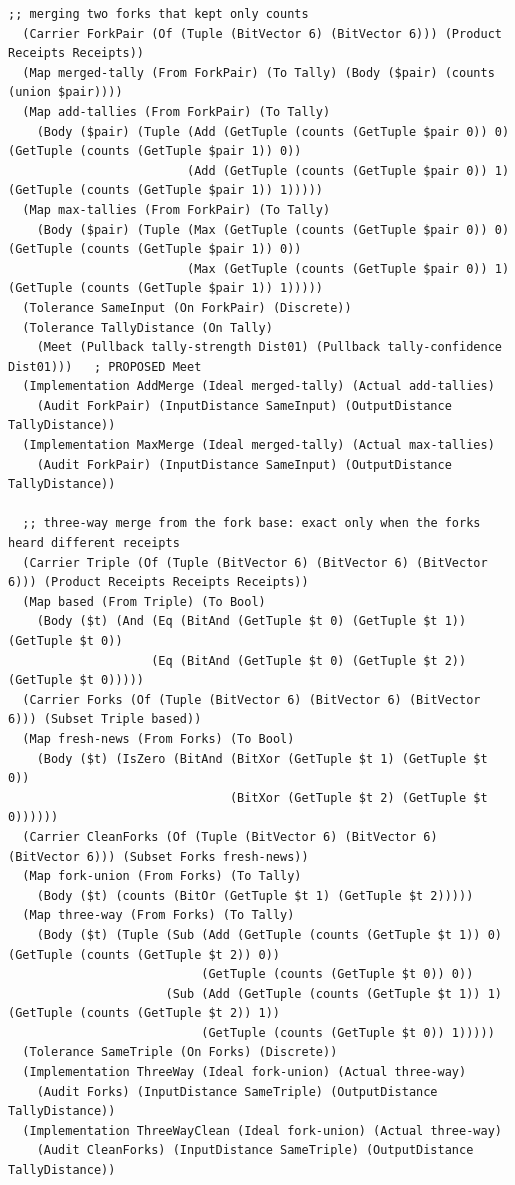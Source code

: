 \documentclass[11pt]{article}
\theoremstyle{definition}
\theoremstyle{plain}
\begin{document}
\begin{lstlisting}[style=mettafull]
  ;; merging two forks that kept only counts
  (Carrier ForkPair (Of (Tuple (BitVector 6) (BitVector 6))) (Product Receipts Receipts))
  (Map merged-tally (From ForkPair) (To Tally) (Body ($pair) (counts (union $pair))))
  (Map add-tallies (From ForkPair) (To Tally)
    (Body ($pair) (Tuple (Add (GetTuple (counts (GetTuple $pair 0)) 0) (GetTuple (counts (GetTuple $pair 1)) 0))
                         (Add (GetTuple (counts (GetTuple $pair 0)) 1) (GetTuple (counts (GetTuple $pair 1)) 1)))))
  (Map max-tallies (From ForkPair) (To Tally)
    (Body ($pair) (Tuple (Max (GetTuple (counts (GetTuple $pair 0)) 0) (GetTuple (counts (GetTuple $pair 1)) 0))
                         (Max (GetTuple (counts (GetTuple $pair 0)) 1) (GetTuple (counts (GetTuple $pair 1)) 1)))))
  (Tolerance SameInput (On ForkPair) (Discrete))
  (Tolerance TallyDistance (On Tally)
    (Meet (Pullback tally-strength Dist01) (Pullback tally-confidence Dist01)))   ; PROPOSED Meet
  (Implementation AddMerge (Ideal merged-tally) (Actual add-tallies)
    (Audit ForkPair) (InputDistance SameInput) (OutputDistance TallyDistance))
  (Implementation MaxMerge (Ideal merged-tally) (Actual max-tallies)
    (Audit ForkPair) (InputDistance SameInput) (OutputDistance TallyDistance))

  ;; three-way merge from the fork base: exact only when the forks heard different receipts
  (Carrier Triple (Of (Tuple (BitVector 6) (BitVector 6) (BitVector 6))) (Product Receipts Receipts Receipts))
  (Map based (From Triple) (To Bool)
    (Body ($t) (And (Eq (BitAnd (GetTuple $t 0) (GetTuple $t 1)) (GetTuple $t 0))
                    (Eq (BitAnd (GetTuple $t 0) (GetTuple $t 2)) (GetTuple $t 0)))))
  (Carrier Forks (Of (Tuple (BitVector 6) (BitVector 6) (BitVector 6))) (Subset Triple based))
  (Map fresh-news (From Forks) (To Bool)
    (Body ($t) (IsZero (BitAnd (BitXor (GetTuple $t 1) (GetTuple $t 0))
                               (BitXor (GetTuple $t 2) (GetTuple $t 0))))))
  (Carrier CleanForks (Of (Tuple (BitVector 6) (BitVector 6) (BitVector 6))) (Subset Forks fresh-news))
  (Map fork-union (From Forks) (To Tally)
    (Body ($t) (counts (BitOr (GetTuple $t 1) (GetTuple $t 2)))))
  (Map three-way (From Forks) (To Tally)
    (Body ($t) (Tuple (Sub (Add (GetTuple (counts (GetTuple $t 1)) 0) (GetTuple (counts (GetTuple $t 2)) 0))
                           (GetTuple (counts (GetTuple $t 0)) 0))
                      (Sub (Add (GetTuple (counts (GetTuple $t 1)) 1) (GetTuple (counts (GetTuple $t 2)) 1))
                           (GetTuple (counts (GetTuple $t 0)) 1)))))
  (Tolerance SameTriple (On Forks) (Discrete))
  (Implementation ThreeWay (Ideal fork-union) (Actual three-way)
    (Audit Forks) (InputDistance SameTriple) (OutputDistance TallyDistance))
  (Implementation ThreeWayClean (Ideal fork-union) (Actual three-way)
    (Audit CleanForks) (InputDistance SameTriple) (OutputDistance TallyDistance))


\end{lstlisting}
\end{document}

